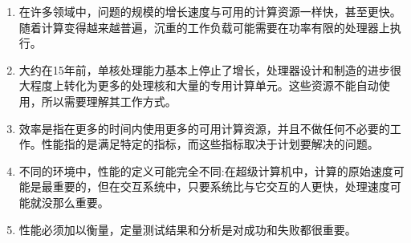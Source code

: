 \begin{enumerate}
\item 
在许多领域中，问题的规模的增长速度与可用的计算资源一样快，甚至更快。随着计算变得越来越普遍，沉重的工作负载可能需要在功率有限的处理器上执行。

\item 
大约在15年前，单核处理能力基本上停止了增长，处理器设计和制造的进步很大程度上转化为更多的处理核和大量的专用计算单元。这些资源不能自动使用，所以需要理解其工作方式。

\item 
效率是指在更多的时间内使用更多的可用计算资源，并且不做任何不必要的工作。性能指的是满足特定的指标，而这些指标取决于计划要解决的问题。

\item
不同的环境中，性能的定义可能完全不同:在超级计算机中，计算的原始速度可能是最重要的，但在交互系统中，只要系统比与它交互的人更快，处理速度可能就没那么重要。

\item
性能必须加以衡量，定量测试结果和分析是对成功和失败都很重要。
	
\end{enumerate}
